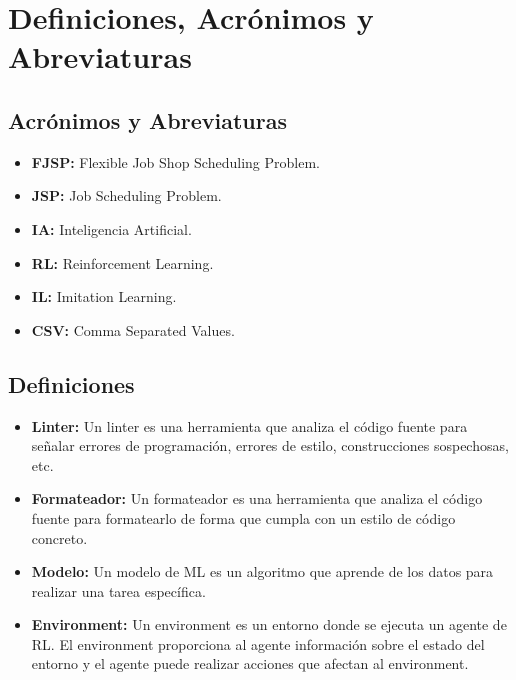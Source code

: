 \section{Definiciones, Acrónimos y Abreviaturas}
\subsection{Acrónimos y Abreviaturas}
\begin{itemize}
    \item \textbf{FJSP: } Flexible Job Shop Scheduling Problem.
    \item \textbf{JSP: } Job Scheduling Problem.
    \item \textbf{IA: } Inteligencia Artificial.
    \item \textbf{RL: } Reinforcement Learning.
    \item \textbf{IL: } Imitation Learning.
    \item \textbf{CSV: } Comma Separated Values.
\end{itemize}

\subsection{Definiciones}
\begin{itemize}
    \item \textbf{Linter: } Un linter es una herramienta que analiza el código fuente 
    para señalar errores de programación, errores de estilo, construcciones sospechosas, etc.
    \item \textbf{Formateador: } Un formateador es una herramienta que analiza el código fuente
    para formatearlo de forma que cumpla con un estilo de código concreto.
    \item \textbf{Modelo: } Un modelo de ML es un algoritmo que aprende de los datos
    para realizar una tarea específica. 
    \item \textbf{Environment: } Un environment es un entorno donde se ejecuta un agente
    de RL. El environment proporciona al agente información sobre el estado del entorno
    y el agente puede realizar acciones que afectan al environment.
\end{itemize}

\pagebreak